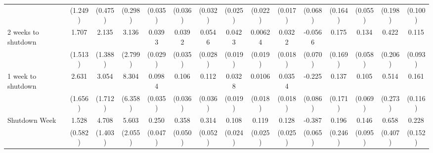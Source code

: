 \begin{table}[htbp]
\begin{tabular}{l*{14}{c}}
                    &     (1.249)         &     (0.475)         &     (0.298)         &     (0.035)         &     (0.036)         &     (0.032)         &     (0.025)         &     (0.022)         &     (0.017)         &     (0.068)         &     (0.164)         &     (0.055)         &     (0.198)         &     (0.100)         \\
[1em]
2 weeks to shutdown &       1.707         &       2.135         &       3.136         &      0.0393         &      0.0392         &      0.0546\sym{*}  &      0.0423\sym{**} &     0.00624         &      0.0322\sym{*}  &     -0.0566         &       0.175         &       0.134\sym{**} &       0.422\sym{**} &       0.115         \\
                    &     (1.513)         &     (1.388)         &     (2.799)         &     (0.029)         &     (0.035)         &     (0.028)         &     (0.019)         &     (0.019)         &     (0.018)         &     (0.070)         &     (0.169)         &     (0.058)         &     (0.206)         &     (0.093)         \\
[1em]
1 week to shutdown  &       2.631         &       3.054\sym{*}  &       8.304         &      0.0984\sym{***}&       0.106\sym{***}&       0.112\sym{***}&      0.0328\sym{*}  &      0.0106         &      0.0354\sym{*}  &      -0.225\sym{***}&       0.137         &       0.105         &       0.514\sym{*}  &       0.161         \\
                    &     (1.656)         &     (1.712)         &     (6.358)         &     (0.035)         &     (0.036)         &     (0.036)         &     (0.019)         &     (0.018)         &     (0.018)         &     (0.086)         &     (0.171)         &     (0.069)         &     (0.273)         &     (0.116)         \\
[1em]
Shutdown Week       &       1.528\sym{***}&       4.708\sym{***}&       5.603\sym{***}&       0.250\sym{***}&       0.358\sym{***}&       0.314\sym{***}&       0.108\sym{***}&       0.119\sym{***}&       0.128\sym{***}&      -0.387\sym{***}&       0.196         &       0.146         &       0.658         &       0.228         \\
                    &     (0.582)         &     (1.403)         &     (2.055)         &     (0.047)         &     (0.050)         &     (0.052)         &     (0.024)         &     (0.025)         &     (0.025)         &     (0.065)         &     (0.246)         &     (0.095)         &     (0.407)         &     (0.152)         \\

\end{tabular}
\end{table}
